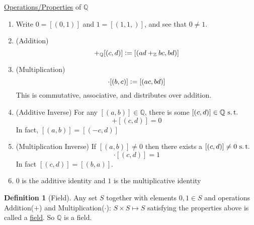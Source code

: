 \documentclass[12pt]{amsart}
\newcommand{\bbZ}{\mathbb{Z}}
\newcommand{\bbQ}{\mathbb{Q}}
\newcommand{\suchthat}{\operatorname{\thinspace s.t. \thinspace}}
\theoremstyle{plain}
\theoremstyle{remark}
\theoremstyle{definition}
\newtheorem*{define}{Definition}
\begin{document}
\par
\ul{Operations/Properties} of $\bbQ$ 
\begin{enumerate}
	\item 
		Write $0 = [(0,1)]$ and $1 = [(1,1,)]$, and see that $0\neq 1$.
	\item (Addition)
		\begin{equation*}
		[(a,b)] +_{\bbQ} [(c,d)] \vcentcolon = [(ad +_{\bbZ} bc, bd)]
		\end{equation*}
	\item (Multiplication)
		\begin{equation*}
			[(a,b)]\cdot [(b,c)] \vcentcolon = [(ac,bd)]
		\end{equation*}
		This is commutative, associative, and distributes over addition.
	\item (Additive Inverse)
		For any $[(a,b)]\in \bbQ$, there is some $[(c,d)] \in \bbQ \suchthat$ 
		\begin{equation*}
		[(a,b)] + [(c,d)] = 0 
		\end{equation*}
		In fact, $[(a,b)] = [(-c,d)]$
	\item (Multiplication Inverse)
		If $[(a,b)] \neq 0$ then there exists a $[(c,d)] \neq 0 \suchthat$ 
		\begin{equation*}
			[(a,b)] \cdot [(c,d)] = 1
		\end{equation*}
		In fact $[(c,d)] = [(b,a)]$. 
	\item
		$0$ is the additive identity and $1$ is the multiplicative identity
\end{enumerate}

\begin{define}[Field]
	Any set $S$ together with elements $0,1 \in S$ and operations Addition($+$) and Multiplication($\cdot$): $S \times S \mapsto S$ satisfying the properties above is called a \ul{field}. So $\bbQ$ is a field.
\end{define}
\end{document}
